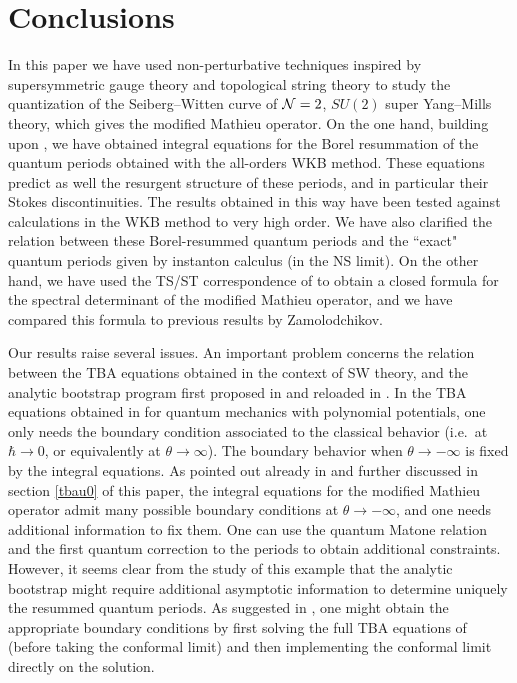 \documentclass[a4paper,11pt]{article}
\theoremstyle{definition}
\newcommand{\CN}{{\cal N}}
\begin{document}
\section{Conclusions}\label{concl}

In this paper we have used non-perturbative techniques inspired by
supersymmetric gauge theory and topological string theory to study the
quantization of the Seiberg--Witten curve of $\CN=2$, $SU(2)$ super
Yang--Mills theory, which gives the modified Mathieu operator. On the
one hand, building upon \cite{gmn, gmn2, oper, ims}, we have obtained
integral equations for the Borel resummation of the quantum periods
obtained with the all-orders WKB method. These equations predict as
well the resurgent structure of these periods, and in particular their
Stokes discontinuities. The results obtained in this way have been
tested against calculations in the WKB method to very high order. We
have also clarified the relation between these Borel-resummed quantum
periods and the ``exact" quantum periods given by instanton calculus
(in the NS limit). On the other hand, we have used the TS/ST
correspondence of \cite{ghm,cgm} to obtain a closed formula for the
spectral determinant of the modified Mathieu operator, and we have
compared this formula to previous results by Zamolodchikov.

Our results raise several issues. An important problem concerns the
relation between the TBA equations obtained in the context of SW
theory, and the analytic bootstrap program first proposed in
\cite{voros-quartic} and reloaded in \cite{ims,mm-s2019}. In the TBA
equations obtained in \cite{oper,ims} for quantum mechanics with
polynomial potentials, one only needs the boundary condition
associated to the classical behavior (i.e.\ at $\hbar \rightarrow 0$,
or equivalently at $\theta \rightarrow \infty$). The boundary behavior
when $\theta \rightarrow -\infty$ is fixed by the integral
equations. As pointed out already in \cite{oper} and further discussed
in section \ref{tbau0} of this paper, the integral equations for the
modified Mathieu operator admit many possible boundary conditions at
$\theta \rightarrow -\infty$, and one needs additional information to
fix them. One can use the quantum Matone relation and the first
quantum correction to the periods to obtain additional constraints.
However, it seems clear from the study of this example that the
analytic bootstrap might require additional asymptotic information to
determine uniquely the resummed quantum periods. As suggested in
\cite{oper}, one might obtain the appropriate boundary conditions by
first solving the full TBA equations of \cite{gmn} (before taking the
conformal limit) and then implementing the conformal limit directly on
the solution.
\end{document}
